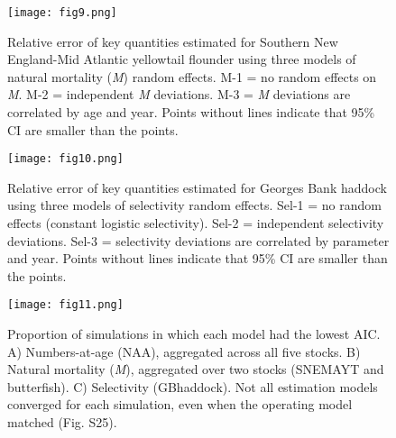 \documentclass[]{article}
\begin{document}
\pagebreak

\begin{figure}

{\centering \texttt{[image: fig9.png]}

}

\caption{Relative error of key quantities estimated for Southern New England-Mid Atlantic yellowtail flounder using three models of natural mortality (\textit{M}) random effects. M-1 = no random effects on \textit{M}. M-2 = independent \textit{M} deviations. M-3 = \textit{M} deviations are correlated by age and year. Points without lines indicate that 95\% CI are smaller than the points.}\label{fig:rel-error-snemayt-m}
\end{figure}

\pagebreak

\begin{figure}

{\centering \texttt{[image: fig10.png]}

}

\caption{Relative error of key quantities estimated for Georges Bank haddock using three models of selectivity random effects. Sel-1 = no random effects (constant logistic selectivity). Sel-2 = independent selectivity deviations. Sel-3 = selectivity deviations are correlated by parameter and year. Points without lines indicate that 95\% CI are smaller than the points.}\label{fig:rel-error-GBhaddock-sel}
\end{figure}

\pagebreak

\begin{figure}

{\centering \texttt{[image: fig11.png]}

}

\caption{Proportion of simulations in which each model had the lowest AIC. A) Numbers-at-age (NAA), aggregated across all five stocks. B) Natural mortality (\textit{M}), aggregated over two stocks (SNEMAYT and butterfish). C) Selectivity (GBhaddock). Not all estimation models converged for each simulation, even when the operating model matched (Fig. S25).}\label{fig:aic-cross}
\end{figure}
\end{document}

